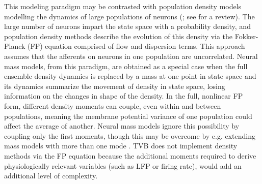 \documentclass{bioinfo}
\begin{document}
This modeling paradigm may be contrasted with population density models modelling the
dynamics of large populations of neurons
(\cite{de1993stochastical, omurtag2000simulation, knight2000dynamics,
gerstner2000population}; see \cite{Deco_2008a} for a review).  The large number
of neurons impart the state space with a probability density, and population
density methods describe the evolution of this density via the Fokker-Planck
(FP) equation \citep{risken1996fokker} comprised of flow and dispersion terms.
This approach assumes that the afferents on neurons in one population are
uncorrelated.  Neural mass models, from this paradigm, are obtained as a
special case when the full ensemble density dynamics is replaced by a mass at
one point in state space and its dynamics summarize the movement of density in
state space, losing information on the changes in shape of the density.  In the
full, nonlinear FP form, different density moments can couple, even within and
between populations, meaning the membrane potential variance of one population
could affect the average of another. Neural mass models ignore this possibility
by coupling only the first moments, though this may be overcome by e.g.
extending mass models with more than one mode \citep{Stefanescu_2008,
Stefanescu_2011}.  TVB does not implement density methods via the FP equation
because the additional moments required to derive physiologically relevant
variables (such as LFP or firing rate), would add an additional level of
complexity.  
\end{document}

